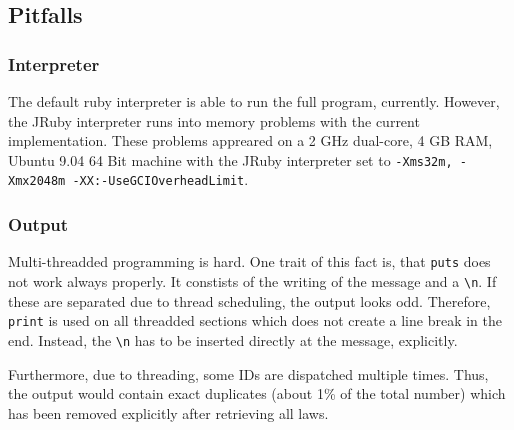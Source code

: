\documentclass{scrartcl}
\begin{document}
\subsection{Pitfalls}
\subsubsection{Interpreter}
The default ruby interpreter is able to run the full program, currently. However, the JRuby interpreter runs into memory problems with the current implementation. These problems appreared on a 2 GHz dual-core, 4 GB RAM, Ubuntu 9.04 64 Bit machine with the JRuby interpreter set to \texttt{-Xms32m, -Xmx2048m -XX:-UseGCIOverheadLimit}.

\subsubsection{Output}
\label{output-pitfalls}
Multi-threadded programming is hard. One trait of this fact is, that \texttt{puts} does not work always properly. It constists of the writing of the message and a \texttt{\textbackslash n}. If these are separated due to thread scheduling, the output looks odd. Therefore, \texttt{print} is used on all threadded sections which does not create a line break in the end. Instead, the \texttt{\textbackslash n} has to be inserted directly at the message, explicitly.

Furthermore, due to threading, some IDs are dispatched multiple times. Thus, the output would contain exact duplicates (about 1\% of the total number) which has been removed explicitly after retrieving all laws.
\end{document}
